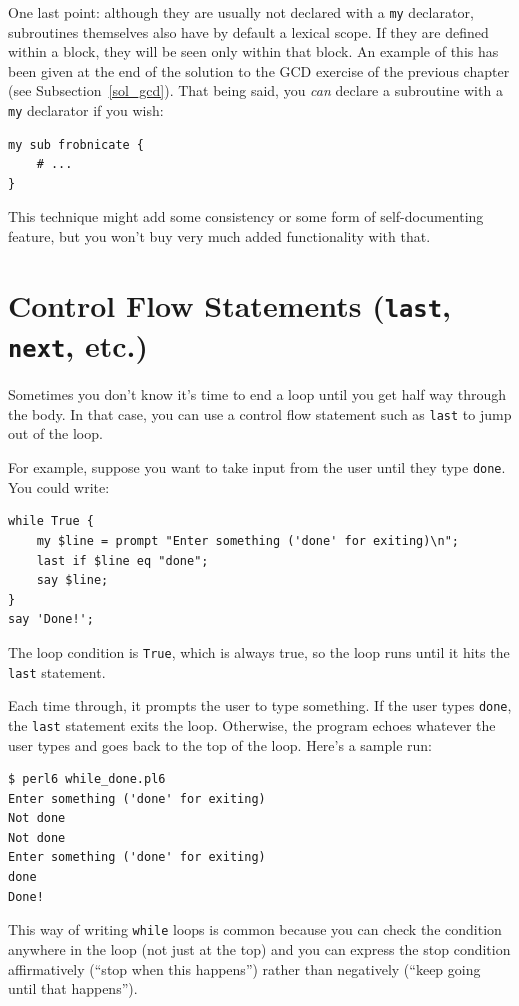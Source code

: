 One last point: although they are usually not declared with 
a {\tt my} declarator, subroutines themselves also have by default
a lexical scope. If they are defined within a block, they will 
be seen only within that block. An example of this has been 
given at the end of the solution to the GCD exercise of the 
previous chapter (see Subsection~\ref{sol_gcd}). 
That being said, you \emph{can} declare a subroutine 
with a {\tt my} declarator if you wish:

\begin{verbatim}
my sub frobnicate { 
    # ... 
}
\end{verbatim}

This technique might add some consistency or some form of 
self-documenting feature, but you won't buy very much 
added functionality with that.
 

\section{Control Flow Statements ({\tt last}, {\tt next}, etc.)}

Sometimes you don't know it's time to end a loop until you get half
way through the body.  In that case, you can use a control flow 
statement such as {\tt last} to jump out of the loop.

For example, suppose you want to take input from the user until they
type {\tt done}.  You could write:

\begin{verbatim}
while True {
    my $line = prompt "Enter something ('done' for exiting)\n";
    last if $line eq "done";
    say $line;
}
say 'Done!';
\end{verbatim}
%
The loop condition is {\tt True}, which is always true, so the
loop runs until it hits the {\tt last} statement.

Each time through, it prompts the user to type something.
If the user types {\tt done}, the {\tt last} statement exits
the loop.  Otherwise, the program echoes whatever the user types
and goes back to the top of the loop.  Here's a sample run:

\begin{verbatim}
$ perl6 while_done.pl6
Enter something ('done' for exiting)
Not done
Not done
Enter something ('done' for exiting)
done
Done!
\end{verbatim}
%
This way of writing {\tt while} loops is common because you
can check the condition anywhere in the loop (not just at the
top) and you can express the stop condition affirmatively
(``stop when this happens'') rather than negatively (``keep 
going until that happens'').

